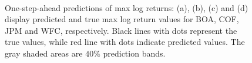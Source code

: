 \documentclass[twoside,11pt]{article}
\begin{document}
\begin{figure}[h]
	\\
	\caption{One-step-ahead predictions of max log returns: (a), (b), (c) and (d) display predicted and true max log return values for BOA, COF, JPM and WFC, respectively. Black lines with dots represent the true values, while red line with dots indicate predicted values. The gray shaded areas are $40\%$ prediction bands.}
	\label{fig:onestepprediction}
\end{figure}
\end{document}
